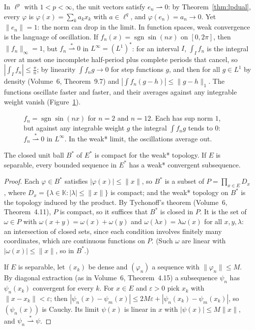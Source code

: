 In $\ell^p$ with $1<p<\infty$, the unit vectors satisfy $e_n\rightharpoonup0$: by Theorem~\ref{thm:lpdual}, every $\varphi$ is $\varphi(x)=\sum_ka_kx_k$ with $a\in\ell^q$, and $\varphi(e_n)=a_n\to0$. Yet $\|e_n\|=1$: the norm can drop
in the limit. In function spaces, weak convergence is the language of oscillation. If $f_n(x)=\operatorname{sgn}\sin(nx)$ on $[0,2\pi]$, then $\|f_n\|_\infty=1$, but $f_n\overset*\rightharpoonup0$ in $L^\infty=(L^1)^*$: for an interval
$I$, $\int_If_n$ is the integral over at most one incomplete half-period plus complete periods that cancel, so $|\int_If_n|\le\frac\pi n$; by linearity $\int f_ng\to0$ for step functions $g$, and then for all $g\in L^1$ by
density (Volume~6, Theorem~9.7) and $|\int f_n(g-h)|\le\|g-h\|_1$. The functions oscillate faster and faster, and their averages against any integrable weight vanish (Figure~\ref{fig:oscillation}).

\begin{figure}[ht]
\centering
{}
\caption{$f_n=\operatorname{sgn}\sin(nx)$ for $n=2$ and $n=12$. Each has sup norm $1$, but against any integrable weight $g$ the integral $\int f_ng$ tends to $0$: $f_n\overset*\rightharpoonup0$ in $L^\infty$. In the weak*
limit, the oscillations average out.}
\label{fig:oscillation}
\end{figure}

\begin{theorem}\label{thm:alaoglu}
The closed unit ball $B^*$ of $E^*$ is compact for the weak* topology. If $E$ is separable, every bounded sequence in $E^*$ has a weak* convergent subsequence.
\end{theorem}
\begin{proof}
Each $\varphi\in B^*$ satisfies $|\varphi(x)|\le\|x\|$, so $B^*$ is a subset of $P=\prod_{x\in E}D_x$, where $D_x=\{\lambda\in\mathbb K:|\lambda|\le\|x\|\}$ is compact; and the weak* topology on $B^*$ is the topology induced by
the product. By Tychonoff's theorem (Volume~6, Theorem~4.11), $P$ is compact, so it suffices that $B^*$ is closed in $P$. It is the set of $\omega\in P$ with $\omega(x+y)=\omega(x)+\omega(y)$ and $\omega(\lambda x)=\lambda\omega(x)$ for all
$x,y,\lambda$: an intersection of closed sets, since each condition involves finitely many coordinates, which are continuous functions on $P$. (Such $\omega$ are linear with $|\omega(x)|\le\|x\|$, so in $B^*$.)

If $E$ is separable, let $(x_k)$ be dense and $(\varphi_n)$ a sequence with $\|\varphi_n\|\le M$. By diagonal extraction (as in Volume~6, Theorem~4.15) a subsequence $\psi_n$ has $\psi_n(x_k)$ convergent for every $k$. For $x\in E$ and
$\varepsilon>0$ pick $x_k$ with $\|x-x_k\|<\varepsilon$; then $|\psi_n(x)-\psi_m(x)|\le2M\varepsilon+|\psi_n(x_k)-\psi_m(x_k)|$, so $(\psi_n(x))$ is Cauchy. Its limit $\psi(x)$ is linear in $x$ with $|\psi(x)|\le M\|x\|$, and
$\psi_n\overset*\rightharpoonup\psi$.
\end{proof}

